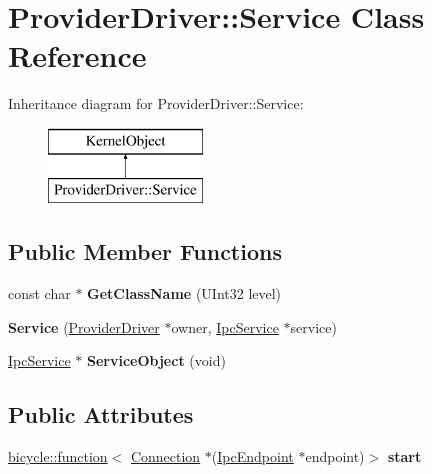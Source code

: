 \hypertarget{class_provider_driver_1_1_service}{}\section{Provider\+Driver\+:\+:Service Class Reference}
\label{class_provider_driver_1_1_service}
Inheritance diagram for Provider\+Driver\+:\+:Service\+:\begin{figure}[H]
\begin{center}
\leavevmode
\includegraphics[height=2.000000cm]{class_provider_driver_1_1_service}
\end{center}
\end{figure}
\subsection*{Public Member Functions}
\begin{DoxyCompactItemize}
\item 
\mbox{\label{class_provider_driver_1_1_service_a2e5cafd60c9052cbacacbd08208260ce}} 
const char $\ast$ {\bfseries Get\+Class\+Name} (U\+Int32 level)
\item 
\mbox{\label{class_provider_driver_1_1_service_a8f096b27d8fada46d5abe0a76ca453a9}} 
{\bfseries Service} (\hyperlink{class_provider_driver}{Provider\+Driver} $\ast$owner, \hyperlink{class_ipc_service}{Ipc\+Service} $\ast$service)
\item 
\mbox{\label{class_provider_driver_1_1_service_aa26061557fa2f89f8ae2b2a398eed432}} 
\hyperlink{class_ipc_service}{Ipc\+Service} $\ast$ {\bfseries Service\+Object} (void)
\end{DoxyCompactItemize}
\subsection*{Public Attributes}
\begin{DoxyCompactItemize}
\item 
\mbox{\label{class_provider_driver_1_1_service_a4c87b0a04efe24cafa19ef522f81490c}} 
\hyperlink{classbicycle_1_1function}{bicycle\+::function}$<$ \hyperlink{class_provider_driver_1_1_connection}{Connection} $\ast$(\hyperlink{class_ipc_endpoint}{Ipc\+Endpoint} $\ast$endpoint)$>$ {\bfseries start}
\end{DoxyCompactItemize}
